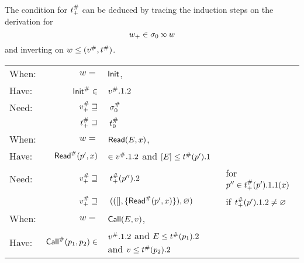 \documentclass{article}
\begin{document}
The condition for ${t}^{\#}_+$ can be deduced by tracing the induction steps on the derivation for
\[w_+\in\ctx_0\semlink w\]
and inverting on $w\le({v}^{\#},{t}^{\#})$.
\begin{center}
	\begin{tabular}{|l@{\hskip2pt}r@{\hskip2pt}l@{\hskip2pt}l|}
		\hline
		When: & $w=$                                & $\textsf{Init}$,                                                                  &                                                              \\
		Have: & ${\textsf{Init}}^{\#}\in$                     & ${v}^{\#}.1.2$                                                              &                                                              \\
		Need: & ${v}^{\#}_+\sqsupseteq$              & $\:{\sigma}^{\#}_0$                                                             &                                                              \\
		      & ${t}^{\#}_+\sqsupseteq$           & $\:{t}^{\#}_0$                                                           &                                                              \\
		\hline
		When: & $w=$                                & $\textsf{Read}(E,x)$,                                                        &                                                              \\
		Have: & ${\textsf{Read}}^{\#}(p',x)$                  & $\in{v}^{\#}.1.2$ and $[E]\le{t}^{\#}(p').1$                         &                                                              \\
		Need: & ${v}^{\#}_+\sqsupseteq$              & $\:{t}^{\#}_+(p'').2$                                                    & for $p''\in{t}^{\#}_+(p').1.1(x)$                          \\
		      & ${v}^{\#}_+\sqsupseteq$              & $\:(([],\{{\textsf{Read}}^{\#}(p',x)\}),\varnothing)$                                & if ${t}^{\#}_+(p').1.2\neq\varnothing$                     \\
		\hline
		When: & $w=$                                & $\textsf{Call}(E,v)$,                                                        &                                                              \\
		Have: & ${\textsf{Call}}^{\#}(p_1,p_2)\in$            & ${v}^{\#}.1.2$ and $E\le{t}^{\#}(p_1).2$ and $v\le{t}^{\#}(p_2).2$ &                                                              \\

\end{tabular}
\end{center}
\end{document}
